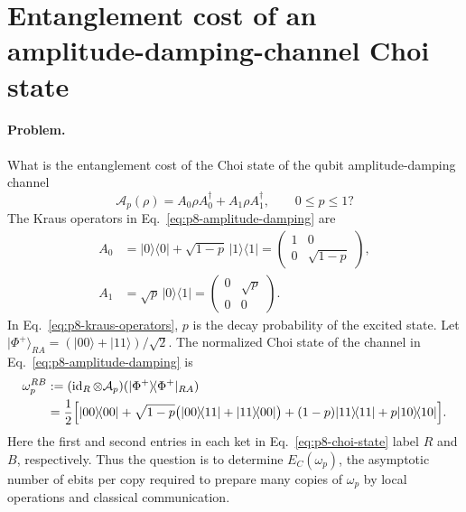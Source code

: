 \section{Entanglement cost of an amplitude-damping-channel Choi state}
\label{sec:op_7a9051ff6d0a1739}

\paragraph{Problem.}
What is the entanglement cost of the Choi state of the qubit
amplitude-damping channel
\begin{equation}
  \mathcal A_p(\rho)=A_0\rho A_0^\dagger+A_1\rho A_1^\dagger,
  \qquad 0\le p\le1?
  \label{eq:p8-amplitude-damping}
\end{equation}
The Kraus operators in Eq.~\eqref{eq:p8-amplitude-damping} are
\begin{equation}
  \begin{aligned}
    A_0&=\lvert0\rangle\!\langle0\rvert
         +\sqrt{1-p}\,\lvert1\rangle\!\langle1\rvert
       =\begin{pmatrix}1&0\\0&\sqrt{1-p}\end{pmatrix},\\
    A_1&=\sqrt p\,\lvert0\rangle\!\langle1\rvert
       =\begin{pmatrix}0&\sqrt p\\0&0\end{pmatrix}.
  \end{aligned}
  \label{eq:p8-kraus-operators}
\end{equation}
In Eq.~\eqref{eq:p8-kraus-operators}, $p$ is the decay probability of the
excited state.  Let
$\lvert\Phi^+\rangle_{RA}=(\lvert00\rangle+\lvert11\rangle)/\sqrt2$.
The normalized Choi state of the channel in
Eq.~\eqref{eq:p8-amplitude-damping} is
\begin{equation}
  \begin{aligned}
    \omega_p^{RB}
      &:=(\operatorname{id}_R\otimes\mathcal A_p)
          (\lvert\Phi^+\rangle\!\langle\Phi^+\rvert_{RA})\\
      &=\frac12\Bigl[
          \lvert00\rangle\!\langle00\rvert
          +\sqrt{1-p}\bigl(\lvert00\rangle\!\langle11\rvert
                           +\lvert11\rangle\!\langle00\rvert\bigr)
          +(1-p)\lvert11\rangle\!\langle11\rvert
          +p\lvert10\rangle\!\langle10\rvert
        \Bigr].
  \end{aligned}
  \label{eq:p8-choi-state}
\end{equation}
Here the first and second entries in each ket in
Eq.~\eqref{eq:p8-choi-state} label $R$ and $B$, respectively.  Thus the
question is to determine $E_C(\omega_p)$, the asymptotic number of ebits per
copy required to prepare many copies of $\omega_p$ by local operations and
classical communication.

